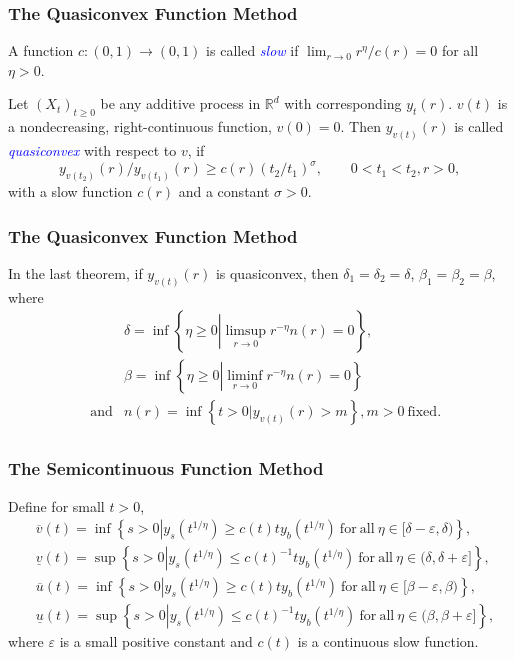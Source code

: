\documentclass[12pt]{beamer}
\def\RR{\mathbb{R}}
\begin{document}
\begin{frame}[label=quasiconvex]
	\frametitle{The Quasiconvex Function Method}
	\begin{definition}
		A function $c:(0,1)\to(0,1)$ is called \emph{\textcolor{blue}{slow}} if $\lim_{r\to0}r^{\eta}/c(r)=0$ for all $\eta>0$.
	\end{definition}
	\pause
	\begin{definition}
		Let $(X_t)_{t\ge0}$ be any additive process in $\RR^d$ with corresponding $y_t(r)$. $v(t)$ is a nondecreasing, right-continuous function, $v(0)=0$. Then $y_{v(t)}(r)$ is called \emph{\textcolor{blue}{quasiconvex}} with respect to $v$, if
		\begin{equation*}
			y_{v(t_2)}(r)/y_{v(t_1)}(r)\ge c(r)(t_2/t_1)^\sigma,\qquad 0<t_1<t_2, r>0,
		\end{equation*}
		with a slow function $c(r)$ and a constant $\sigma>0$.
	\end{definition}
\end{frame}
\begin{frame}
	\frametitle{The Quasiconvex Function Method}
	\begin{theorem}
		In the last theorem, if $y_{v(t)}(r)$ is quasiconvex, then $\delta_1=\delta_2=\delta$, $\beta_1=\beta_2=\beta$, where
		\vspace{-1ex}
		\begin{eqnarray*}
			& & \delta=\inf\left\{ \eta\ge0\left|\limsup_{r\to0} r^{-\eta} n(r)=0\right. \right\}, \\[1ex]
			& & \beta=\inf\left\{ \eta\ge0\left|\liminf_{r\to0} r^{-\eta} n(r)=0\right. \right\} \\[1ex]
			& \mathrm{and} & n(r)=\inf\left\{ t>0|y_{v(t)}(r)>m \right\}, m>0 \mathrm{\ fixed}. \\
		\end{eqnarray*}
	\end{theorem}
\end{frame}
\begin{frame}
	\frametitle{The Semicontinuous Function Method}
	\begin{definition}
		Define for small $t>0$,
		\begin{equation*}
			\begin{split}
				& \overline v(t)=\inf\left\{ s>0\left|y_s(t^{1/\eta})\ge c(t)ty_b(t^{1/\eta})\mathrm{\ for\ all\ }\eta\in[\delta-\varepsilon,\delta)\right. \right\},\\
				& \underline v(t)=\sup\left\{ s>0\left|y_s(t^{1/\eta})\le c(t)^{-1}ty_b(t^{1/\eta})\mathrm{\ for\ all\ }\eta\in(\delta,\delta+\varepsilon]\right. \right\},\\
				& \overline u(t)=\inf\left\{ s>0\left|y_s(t^{1/\eta})\ge c(t)ty_b(t^{1/\eta})\mathrm{\ for\ all\ }\eta\in[\beta-\varepsilon,\beta)\right. \right\},\\
				& \underline u(t)=\sup\left\{ s>0\left|y_s(t^{1/\eta})\le c(t)^{-1}ty_b(t^{1/\eta})\mathrm{\ for\ all\ }\eta\in(\beta,\beta+\varepsilon]\right. \right\},
			\end{split}
		\end{equation*}
		where $\varepsilon$ is a small positive constant and $c(t)$ is a continuous slow function.
	\end{definition}
\end{frame}
\end{document}
